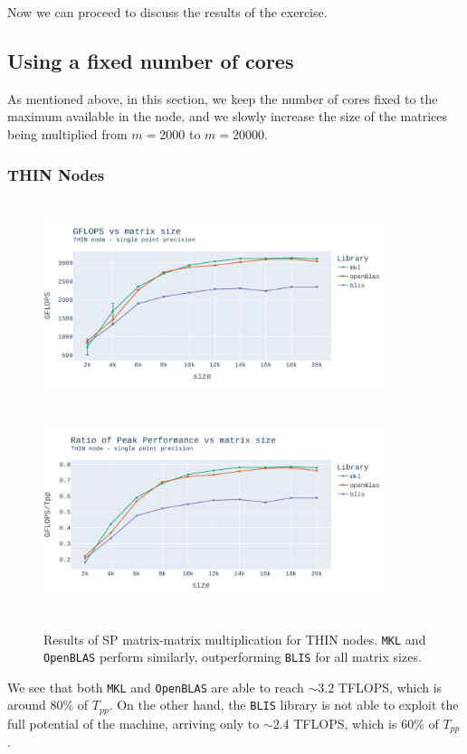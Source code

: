 \documentclass{report}
\begin{document}
Now we can proceed to discuss the results of the exercise.

\subsection{Using a fixed number of cores}

As mentioned above, in this section, we keep the number of cores fixed to the 
maximum available in the node, and we slowly increase the size of the matrices 
being multiplied from $m=2000$ to $m=20000$. 

\subsubsection{THIN Nodes}

\begin{figure}[h!]
\hspace*{-2.5cm}
\includegraphics[width=10cm, height=6cm]{./images/fixed_cores_thin_float_gflops.pdf}
\includegraphics[width=10cm, height=6cm]{./images/fixed_cores_thin_float_gflops_ratio.pdf}
\caption{\label{fig:fixed_cores_thin_float} Results of SP matrix-matrix multiplication 
for THIN nodes. \texttt{MKL} and \texttt{OpenBLAS} perform similarly, outperforming 
\texttt{BLIS} for all matrix sizes.}
\end{figure}
We see that both \texttt{MKL} and 
\texttt{OpenBLAS} are able to reach $\sim 3.2$ TFLOPS, which is around 
$80\%$ of $T_{pp}$. On the other hand, the \texttt{BLIS} library is not 
able to exploit the full potential of the machine, arriving only to 
$\sim 2.4$ TFLOPS, which is $60\%$ of $T_{pp}$.
\end{document}

